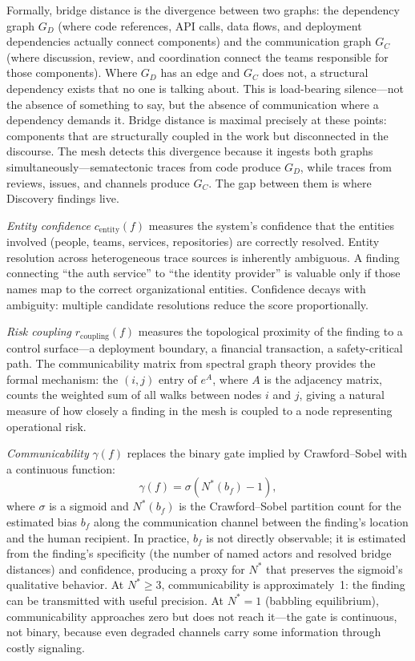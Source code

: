 \documentclass[11pt,a4paper]{article}
\begin{document}
Formally, bridge distance is the divergence between two graphs: the dependency graph $G_D$ (where code references, API calls, data flows, and deployment dependencies actually connect components) and the communication graph $G_C$ (where discussion, review, and coordination connect the teams responsible for those components). Where $G_D$ has an edge and $G_C$ does not, a structural dependency exists that no one is talking about. This is load-bearing silence---not the absence of something to say, but the absence of communication where a dependency demands it. Bridge distance is maximal precisely at these points: components that are structurally coupled in the work but disconnected in the discourse. The mesh detects this divergence because it ingests both graphs simultaneously---sematectonic traces from code produce $G_D$, while traces from reviews, issues, and channels produce $G_C$. The gap between them is where Discovery findings live.

\emph{Entity confidence} $c_{\text{entity}}(f)$ measures the system's confidence that the entities involved (people, teams, services, repositories) are correctly resolved. Entity resolution across heterogeneous trace sources is inherently ambiguous. A finding connecting ``the auth service'' to ``the identity provider'' is valuable only if those names map to the correct organizational entities. Confidence decays with ambiguity: multiple candidate resolutions reduce the score proportionally.

\emph{Risk coupling} $r_{\text{coupling}}(f)$ measures the topological proximity of the finding to a control surface---a deployment boundary, a financial transaction, a safety-critical path. The communicability matrix from spectral graph theory \citep{estrada2008} provides the formal mechanism: the $(i,j)$ entry of $e^{A}$, where $A$ is the adjacency matrix, counts the weighted sum of all walks between nodes $i$ and $j$, giving a natural measure of how closely a finding in the mesh is coupled to a node representing operational risk.

\emph{Communicability} $\gamma(f)$ replaces the binary gate implied by Crawford--Sobel with a continuous function:
\begin{equation}
\label{eq:communicability}
\gamma(f) = \sigma\!\left(N^*(b_f) - 1\right),
\end{equation}
where $\sigma$ is a sigmoid and $N^*(b_f)$ is the Crawford--Sobel partition count for the estimated bias $b_f$ along the communication channel between the finding's location and the human recipient. In practice, $b_f$ is not directly observable; it is estimated from the finding's specificity (the number of named actors and resolved bridge distances) and confidence, producing a proxy for $N^*$ that preserves the sigmoid's qualitative behavior. At $N^* \geq 3$, communicability is approximately~1: the finding can be transmitted with useful precision. At $N^* = 1$ (babbling equilibrium), communicability approaches zero but does not reach it---the gate is continuous, not binary, because even degraded channels carry some information through costly signaling.
\end{document}
